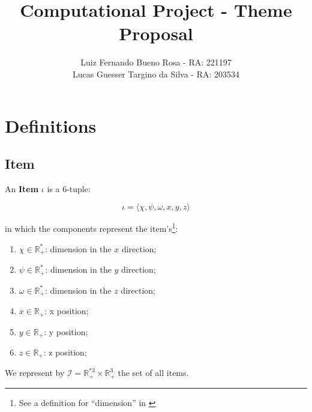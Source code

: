 \documentclass{article}
\title{Computational Project - Theme Proposal}
\author{
	Luiz Fernando Bueno Rosa - RA: 221197 \\
	Lucas Guesser Targino da Silva - RA: 203534
}
\newcommand{\realnonnegative}{\ensuremath{\mathbb{R}_{+}}\xspace}
\newcommand{\realpositive}{\ensuremath{\mathbb{R}_{+}^{*}}\xspace}
\newcommand{\nrealnonnegative}[1]{\ensuremath{\mathbb{R}_{+}^{#1}}\xspace}
\newcommand{\nrealpositive}[1]{\ensuremath{\mathbb{R}_{+}^{*#1}}\xspace}
\newcommand{\tuple}[1]{#1-tuple\xspace}
\newcommand{\OrderedSet}[1]{\ensuremath{\langle#1\rangle}\xspace}
\newcommand{\itemO}{\ensuremath{\iota}\xspace}
\newcommand{\itemSet}{\ensuremath{\mathcal{I}}\xspace}
\newcommand{\itemDomain}{\ensuremath{\nrealpositive{3} \times \nrealnonnegative{3}}\xspace}
\newcommand{\containero}{\ensuremath{c}\xspace}
\newcommand{\lx}{\ensuremath{\chi}\xspace}
\newcommand{\ly}{\ensuremath{\psi}\xspace}
\newcommand{\lz}{\ensuremath{\omega}\xspace}
\newcommand{\px}{\ensuremath{x}\xspace}
\newcommand{\py}{\ensuremath{y}\xspace}
\newcommand{\pz}{\ensuremath{z}\xspace}
\begin{document}
\maketitle

\section{Definitions}

\subsection{Item}

An \textbf{Item} \itemO is a \tuple{6}:

\begin{equation}
	\label{def:item}
	\itemO = \OrderedSet{
		\lx,
		\ly,
		\lz,
		\px,
		\py,
		\pz
	}
\end{equation}

in which the components represent the item's\footnote{See a definition for ``dimension'' in \cite{bib:dict-dimension}}:

\begin{enumerate}
	\item $\lx \in \realpositive$: dimension in the \px direction;
	\item $\ly \in \realpositive$: dimension in the \py direction;
	\item $\lz\in \realpositive$: dimension in the \pz direction;
	\item $\px \in \realnonnegative$: x position;
	\item $\py \in \realnonnegative$: y position;
	\item $\pz \in \realnonnegative$: z position;
\end{enumerate}

We represent by $\itemSet = \itemDomain$ the set of all items.

%
%
%
%
\end{document}
